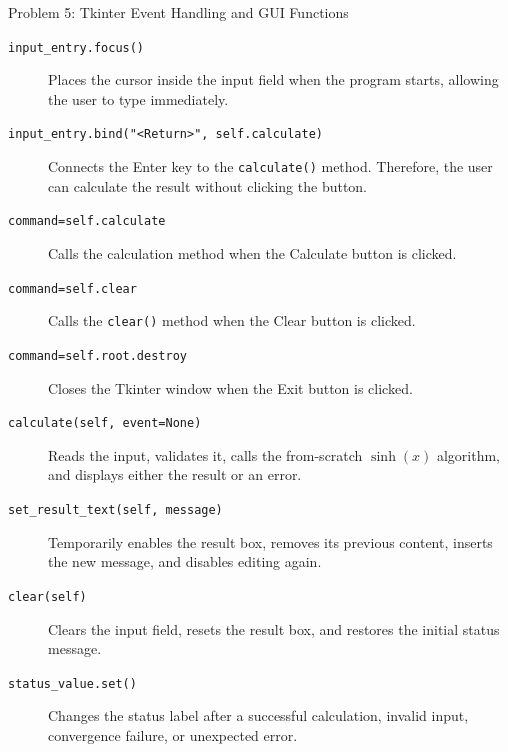 \documentclass[aspectratio=169,11pt]{beamer}
\begin{document}
\begin{frame}[t]{Problem 5: Tkinter Event Handling and GUI Functions}
\scriptsize

\begin{description}

\item[\texttt{input\_entry.focus()}]
Places the cursor inside the input field when the program starts,
allowing the user to type immediately.

\item[\texttt{input\_entry.bind("<Return>", self.calculate)}]
Connects the Enter key to the \texttt{calculate()} method. Therefore,
the user can calculate the result without clicking the button.

\item[\texttt{command=self.calculate}]
Calls the calculation method when the Calculate button is clicked.

\item[\texttt{command=self.clear}]
Calls the \texttt{clear()} method when the Clear button is clicked.

\item[\texttt{command=self.root.destroy}]
Closes the Tkinter window when the Exit button is clicked.

\item[\texttt{calculate(self, event=None)}]
Reads the input, validates it, calls the from-scratch
$\sinh(x)$ algorithm, and displays either the result or an error.

\item[\texttt{set\_result\_text(self, message)}]
Temporarily enables the result box, removes its previous content,
inserts the new message, and disables editing again.

\item[\texttt{clear(self)}]
Clears the input field, resets the result box, and restores the
initial status message.

\item[\texttt{status\_value.set()}]
Changes the status label after a successful calculation, invalid
input, convergence failure, or unexpected error.

\end{description}

\end{frame}


\end{document}
